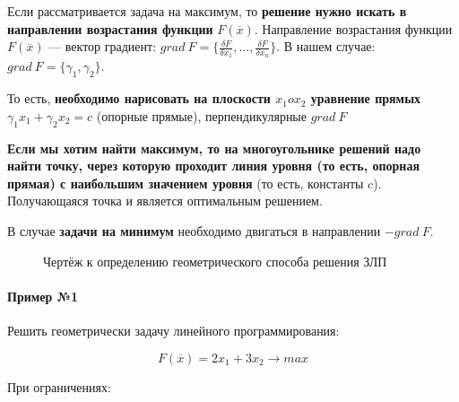 \documentclass{article}
\begin{document}
Если рассматривается задача на максимум, то \textbf{решение нужно искать в направлении возрастания функции} $F(\overline{x})$. Направление возрастания функции $F(\overline{x})$ — вектор градиент: $grad \ F = \{ \frac{\delta F}{\delta x_1}, \dots, \frac{\delta F}{\delta x_{n}} \}$. В нашем случае: $grad \ F = \{ \gamma_1, \gamma_2 \}$.

То есть, \textbf{необходимо нарисовать на плоскости $x_1 o x_2$ уравнение прямых} $\gamma_1 x_1 + \gamma_2 x_2 = c$ (опорные прямые), перпендикулярные $grad \ F$

\textbf{Если мы хотим найти максимум, то на многоугольнике решений надо найти точку, через которую проходит линия уровня (то есть, опорная прямая) с наибольшим значением уровня} (то есть, константы $c$). Получающаяся точка и является оптимальным решением.

В случае \textbf{задачи на минимум} необходимо двигаться в направлении $- grad \ F$.

\begin{figure}[ht]
    \centering
    \caption{Чертёж к определению геометрического способа решения ЗЛП}
\end{figure}

\paragraph{Пример №1}

Решить геометрически задачу линейного программирования:

$$F(\overline{x}) = 2 x_1 + 3x_2 \to max$$

При ограничениях:
\end{document}
